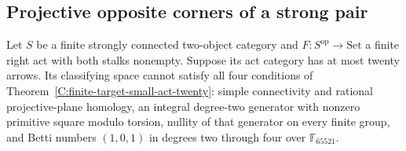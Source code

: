 \subsection{Projective opposite corners of a strong pair}

\begin{proposition}\label{C:finite-target-strong-pair-twenty}
Let $S$ be a finite strongly connected two-object category and
$F:S^{\mathrm{op}}\to\mathrm{Set}$ a finite right act with both
stalks nonempty. Suppose its act category has at most twenty
arrows. Its classifying space cannot satisfy all four conditions
of Theorem~\ref{C:finite-target-small-act-twenty}: simple
connectivity and rational projective-plane homology, an integral
degree-two generator with nonzero primitive square modulo
torsion, nullity of that generator on every finite group, and
Betti numbers $(1,0,1)$ in degrees two through four over
$\mathbb F_{65521}$.
\end{proposition}
